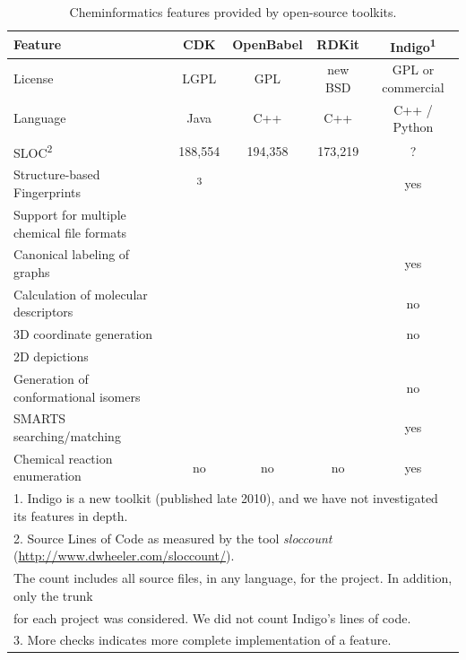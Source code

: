 \documentclass{sig-alternate}
\newcommand{\none}{\ding{55}}
\newcommand{\least}{\ding{51}}
\newcommand{\little}{\ding{51}\ding{51}}
\newcommand{\lots}{\ding{51}\ding{51}\ding{51}}
\begin{document}
%
\begin{table}
  \centering
  \begin{tabular}{lcccc}  \hline
    \textbf{Feature} & \textbf{CDK} & \textbf{OpenBabel} &
    \textbf{RDKit} & \textbf{Indigo}\textsuperscript{1} \tabularnewline \hline
    License & LGPL & GPL & new BSD & GPL or commercial \tabularnewline
    Language & Java & C++ & C++ & C++ / Python \tabularnewline
    SLOC\textsuperscript{2} & 188,554 & 194,358 & 173,219 & ? \tabularnewline
    Structure-based Fingerprints & \lots\textsuperscript{3} & \lots & \lots & yes \tabularnewline
    Support for multiple chemical file formats & \little & \lots & \least & \little \tabularnewline
    Canonical labeling of graphs & \lots & \lots & \lots & yes \tabularnewline
    Calculation of molecular descriptors & \lots & \least & \lots & no \tabularnewline
    3D coordinate generation & \least & \lots & \lots & no \tabularnewline
    2D depictions & \lots & \little & \lots & \little \tabularnewline
    Generation of conformational isomers & \none & \least & \least & no \tabularnewline
    SMARTS searching/matching & \lots & \lots & \lots & yes \tabularnewline
    Chemical reaction enumeration & no & no & no & yes \tabularnewline
    \hline
    \multicolumn{5}{l}{1. Indigo is a new toolkit (published late 2010), and we have not investigated its features in depth.} \\
    \multicolumn{5}{l}{2. Source Lines of Code as measured by the tool \emph{sloccount} (\url{http://www.dwheeler.com/sloccount/}).} \\
    \multicolumn{5}{l}{The count includes all source files, in any language, for the
  project. In addition, only the trunk} \\
    \multicolumn{5}{l}{for each project was considered.  We did not count Indigo's lines of code.} \\
    \multicolumn{5}{l}{3. More checks indicates more complete implementation of a feature.} \\
  \end{tabular}
  \caption{Cheminformatics features provided by open-source toolkits.}
  \label{tab:features}
\end{table}
\end{document}
